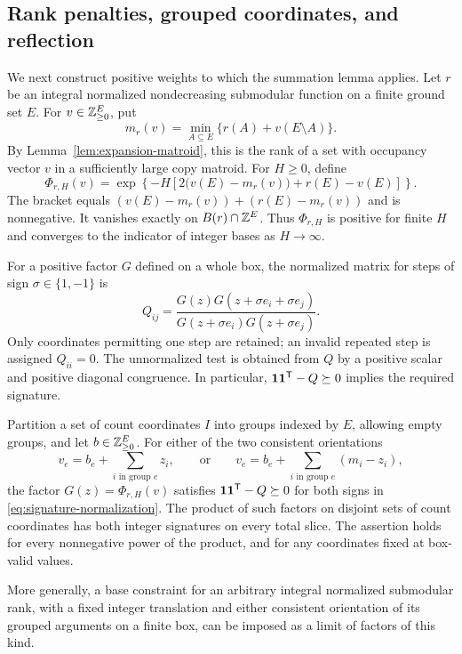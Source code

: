 \subsection{Rank penalties, grouped coordinates, and reflection}

We next construct positive weights to which the summation lemma
applies.  Let $r$ be an integral normalized nondecreasing submodular
function on a finite ground set $E$.  For $v\in\mathbb Z_{\ge0}^E$, put
\[
 m_r(v)=\min_{A\subseteq E}\{r(A)+v(E\setminus A)\}.
\]
By Lemma~\ref{lem:expansion-matroid}, this is the rank of a set
with occupancy vector $v$ in a sufficiently large copy matroid.
For $H\ge0$, define
\begin{equation}
 \Phi_{r,H}(v)=
 \exp\!\left\{-H\left[2\bigl(v(E)-m_r(v)\bigr)
                         +r(E)-v(E)\right]\right\}.
 \label{eq:rank-soft-weight}
\end{equation}
The bracket equals $(v(E)-m_r(v))+(r(E)-m_r(v))$ and is
nonnegative.  It vanishes exactly on $B(r)\cap\mathbb Z^E$.
Thus $\Phi_{r,H}$ is positive for finite $H$ and converges to the
indicator of integer bases as $H\to\infty$.

For a positive factor $G$ defined on a whole box, the normalized
matrix for steps of sign $\sigma\in\{1,-1\}$ is
\begin{equation}
 Q_{ij}=\frac{G(z)G(z+\sigma e_i+\sigma e_j)}
                   {G(z+\sigma e_i)G(z+\sigma e_j)}.
 \label{eq:signature-normalization}
\end{equation}
Only coordinates permitting one step are retained; an invalid
repeated step is assigned $Q_{ii}=0$.
The unnormalized test is obtained from $Q$ by a positive scalar
and positive diagonal congruence.  In particular,
$\mathbf 1\mathbf 1^{\mathsf T}-Q\succeq0$ implies the required signature.

\begin{lemma}
\label{lem:rank-signatures}
Partition a set of count coordinates $I$ into groups indexed by $E$,
allowing empty groups, and let $b\in\mathbb Z_{\ge0}^E$.
For either of the two consistent orientations
\[
 v_e=b_e+\sum_{i\text{ in group }e}z_i,
 \qquad\text{or}\qquad
 v_e=b_e+\sum_{i\text{ in group }e}(m_i-z_i),
\]
the factor $G(z)=\Phi_{r,H}(v)$ satisfies
$\mathbf 1\mathbf 1^{\mathsf T}-Q\succeq0$ for both signs in
\eqref{eq:signature-normalization}.
The product of such factors on disjoint sets of count coordinates
has both integer signatures on every total slice.  The assertion
holds for every nonnegative power of the product, and for any
coordinates fixed at box-valid values.

More generally, a base constraint for an arbitrary integral
normalized submodular rank, with a fixed integer translation and
either consistent orientation of its grouped arguments on a finite
box, can be imposed as a limit of factors of this kind.
\end{lemma}

